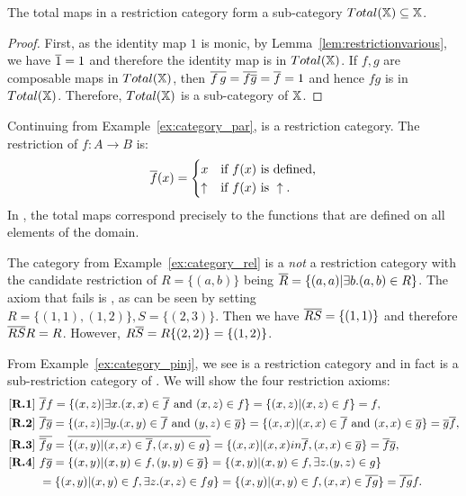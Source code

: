 \begin{lemma}\label{lem:total_maps_form_sub_category}
   The total maps in a restriction category form a sub-category  $Total(\mathbb{X}) \subseteq \mathbb{X}$.
\end{lemma}
\begin{proof}
  First, as the identity map $1$ is monic, by Lemma~\ref{lem:restrictionvarious}, we have $\overline{1} =
  1$ and therefore the identity map is in $Total(\mathbb{X})$. If $f,g$ are composable maps in $Total(\mathbb{X})$,
  then $\overline{f\,g} = \overline{f\overline{g}} = \overline{f} = 1$ and hence $f g$ is in $Total(\mathbb{X})$. Therefore,
  $Total(\mathbb{X})$ is a sub-category of $\mathbb{X}$.
\end{proof}
\begin{example}[\Par]\label{ex:par_is_a_restriction_category}
Continuing from Example~\ref{ex:category_par}, \Par is a restriction category. The restriction of $f:A\to B$ is:
\[
  \overline{f}(x) =
  \begin{cases}
    x&\text{if $f(x)$ is defined,}\\
    \uparrow&\text{if }f(x)\text{ is }\uparrow.
  \end{cases}
\]
In \Par, the
total maps correspond precisely to the functions that are defined on all elements of the domain.
\end{example}

\begin{example}[\rel]\label{ex:rel_is_not_a_restriction_category}
The category \rel from Example~\ref{ex:category_rel} is a \emph{not} a restriction category with the
candidate restriction of $R=\{(a,b)\}$ being $\overline{R} = \{(a,a) | \exists b. (a,b) \in R\}$. The
axiom that fails is \rfour, as can be seen by setting $R=\{(1,1),(1,2)\}, S=\{(2,3)\}$. Then we
have $\overline{RS} = \{(1,1)\}$ and therefore $\overline{RS} R = R$. However, $R\overline{S} = R\{(2,2)\} = \{(1,2)\}$.
\end{example}

\begin{example}[\pinj]\label{ex:pinj_is_a_restriction_category}
From Example~\ref{ex:category_pinj}, we see \pinj is a restriction category and in fact is a
sub-restriction category of \Par. We will show the four restriction axioms:
\begin{align*}
  \rone\ & \rst{f}f = \{(x,z) | \exists x. (x,x) \in \rst{f} \text{ and } (x,z) \in f\} = \{(x,z) |
  (x,z) \in f\} = f,\\
  \rtwo\ & \rst{f}\rst{g} = \{(x,z) | \exists y. (x,y) \in \rst{f} \text{ and } (y,z) \in \rst{g}\} =
  \{(x,x) | (x,x) \in \rst{f} \text{ and } (x,x) \in \rst{g}\} = \rst{g}\rst{f},\\
  \rthree\ & \rst{\rst{f} g} = \rst{\{(x,y) | (x,x) \in \rst{f}, (x,y) \in g\}} = \{(x,x) | (x,x) in
  \rst{f}, (x,x) \in \rst{g} \} = \rst{f} \rst{g},\\
  \rfour\ & f \rst{g} = \{(x,y) | (x,y) \in f, (y,y) \in \rst{g}\} =  \{(x,y) | (x,y) \in f, \exists
  z. (y,z) \in g\} \\
  &=  \{(x,y) | (x,y) \in f, \exists z. (x,z) \in f g\} =  \{(x,y) | (x,y) \in f,
  (x,x) \in \rst{f g}\} = \rst{f g} f.
\end{align*}
\end{example}


